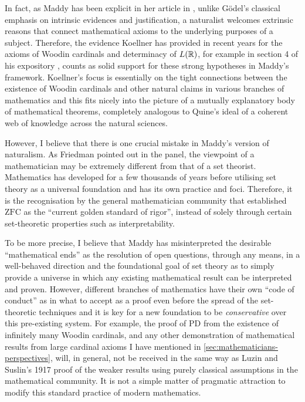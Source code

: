 \documentclass[12pt]{article}
\theoremstyle{plain}
\theoremstyle{definition}
\newcommand{\ZFC}{\mathrm{ZFC}}
\newcommand{\PD}{\mathrm{PD}}
\begin{document}
In fact, as Maddy has been explicit in her article in \cite{new-axioms-panel}, unlike G\"odel's classical emphasis on intrinsic evidences and justification, a naturalist welcomes extrinsic reasons that connect mathematical axioms to the underlying purposes of a subject. Therefore, the evidence Koellner has provided in recent years for the axioms of Woodin cardinals and determinacy of $L\mleft(\mathbb{R}\mright)$, for example in section 4 of his expository \cite{koellner-pluralism}, counts as solid support for these strong hypotheses in Maddy's framework. Koellner's focus is essentially on the tight connections between the existence of Woodin cardinals and other natural claims in various branches of mathematics and this fits nicely into the picture of a mutually explanatory body of mathematical theorems, completely analogous to Quine's ideal of a coherent web of knowledge across the natural sciences.

However, I believe that there is one crucial mistake in Maddy's version of naturalism. As Friedman pointed out in the panel, the viewpoint of a mathematician may be extremely different from that of a set theorist. Mathematics has developed for a few thousands of years before utilising set theory as a universal foundation and has its own practice and foci. Therefore, it is the recognisation by the general mathematician community that established $\ZFC$ as the ``current golden standard of rigor'', instead of solely through certain set-theoretic properties such as interpretability.

To be more precise, I believe that Maddy has misinterpreted the desirable ``mathematical ends'' as the resolution of open questions, through any means, in a well-behaved direction and the foundational goal of set theory as to simply provide a universe in which any existing mathematical result can be interpreted and proven. However, different branches of mathematics have their own ``code of conduct'' as in what to accept as a proof even before the spread of the set-theoretic techniques and it is key for a new foundation to be \emph{conservative} over this pre-existing system. For example, the proof of $\PD$ from the existence of infinitely many Woodin cardinals, and any other demonstration of mathematical results from large cardinal axioms I have mentioned in \autoref{sec:mathematicians-perspectives}, will, in general, not be received in the same way as Luzin and Suslin's 1917 proof of the weaker results using purely classical assumptions in the mathematical community. It is not a simple matter of pragmatic attraction to modify this standard practice of modern mathematics.
\end{document}
